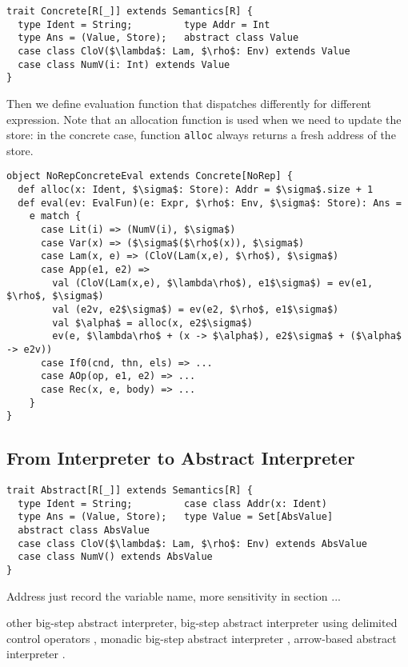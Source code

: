 \begin{lstlisting}
trait Concrete[R[_]] extends Semantics[R] {
  type Ident = String;         type Addr = Int
  type Ans = (Value, Store);   abstract class Value
  case class CloV($\lambda$: Lam, $\rho$: Env) extends Value
  case class NumV(i: Int) extends Value
}
\end{lstlisting}

Then we define evaluation function that dispatches differently for different expression.
Note that an allocation function is used when we need to update the store: 
in the concrete case, function \texttt{alloc} always returns a fresh address of the store.

\begin{lstlisting}
object NoRepConcreteEval extends Concrete[NoRep] {
  def alloc(x: Ident, $\sigma$: Store): Addr = $\sigma$.size + 1
  def eval(ev: EvalFun)(e: Expr, $\rho$: Env, $\sigma$: Store): Ans = 
    e match {
      case Lit(i) => (NumV(i), $\sigma$)
      case Var(x) => ($\sigma$($\rho$(x)), $\sigma$)
      case Lam(x, e) => (CloV(Lam(x,e), $\rho$), $\sigma$)
      case App(e1, e2) =>
        val (CloV(Lam(x,e), $\lambda\rho$), e1$\sigma$) = ev(e1, $\rho$, $\sigma$)
        val (e2v, e2$\sigma$) = ev(e2, $\rho$, e1$\sigma$)
        val $\alpha$ = alloc(x, e2$\sigma$)
        ev(e, $\lambda\rho$ + (x -> $\alpha$), e2$\sigma$ + ($\alpha$ -> e2v))
      case If0(cnd, thn, els) => ...
      case AOp(op, e1, e2) => ...
      case Rec(x, e, body) => ...
    }
}
\end{lstlisting}

\subsection{From Interpreter to Abstract Interpreter}

\begin{lstlisting}
trait Abstract[R[_]] extends Semantics[R] {
  type Ident = String;         case class Addr(x: Ident)
  type Ans = (Value, Store);   type Value = Set[AbsValue]
  abstract class AbsValue
  case class CloV($\lambda$: Lam, $\rho$: Env) extends AbsValue
  case class NumV() extends AbsValue
}
\end{lstlisting}

Address just record the variable name, more sensitivity in section ...

other big-step abstract interpreter, 
big-step abstract interpreter using delimited control operators \cite{Wei:2018:RAA:3243631.3236800},
monadic big-step abstract interpreter \cite{DBLP:journals/pacmpl/DaraisLNH17},
arrow-based abstract interpreter \cite{Keidel:2018:CSP:3243631.3236767}.

